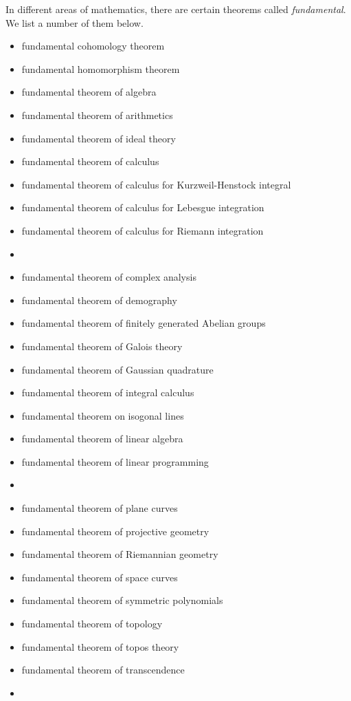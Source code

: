 \documentclass[12pt]{article}
\theoremstyle{definition}
\begin{document}
In different areas of mathematics, there are certain  theorems called \emph{fundamental}.\, We list a number of them below.

\begin{itemize}
\item fundamental cohomology theorem 
\item fundamental homomorphism theorem 
\item fundamental theorem of algebra
\item fundamental theorem of arithmetics 
\item fundamental theorem of ideal theory
\item fundamental theorem of calculus
\item fundamental theorem of calculus for Kurzweil-Henstock integral
\item fundamental theorem of calculus for Lebesgue integration
\item fundamental theorem of calculus for Riemann integration
\item {}
\item fundamental theorem of complex analysis
\item fundamental theorem of demography
\item fundamental theorem of finitely generated Abelian groups
\item fundamental theorem of Galois theory
\item fundamental theorem of Gaussian quadrature 
\item fundamental theorem of integral calculus
\item fundamental theorem on isogonal lines
\item fundamental theorem of linear algebra
\item fundamental theorem of linear programming
\item {}
\item fundamental theorem of plane curves
\item fundamental theorem of projective geometry
\item fundamental theorem of Riemannian geometry 
\item fundamental theorem of space curves
\item fundamental theorem of symmetric polynomials 
\item fundamental theorem of topology 
\item fundamental theorem of topos theory
\item fundamental theorem of transcendence
\item {}

\end{itemize}
\end{document}
